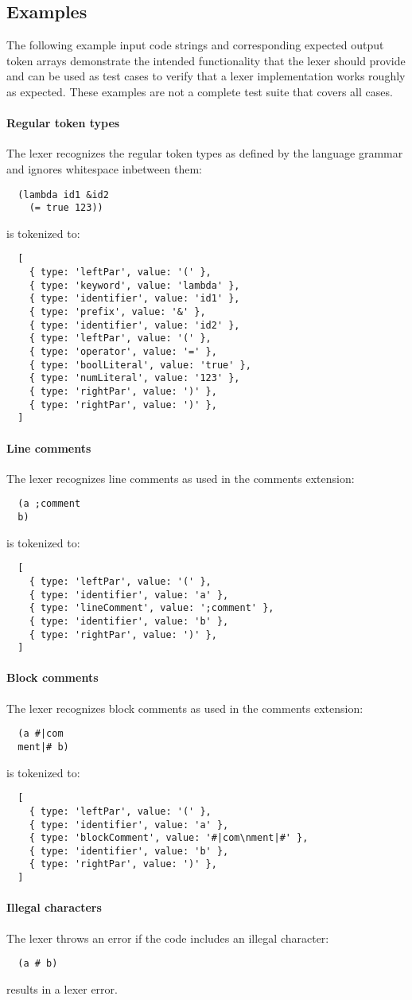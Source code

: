 \subsection{Examples}
The following example input code strings and corresponding expected output token arrays
demonstrate the intended functionality that the lexer should provide
and can be used as test cases to verify that a lexer implementation works roughly as expected.
These examples are not a complete test suite that covers all cases.

\paragraph{Regular token types}
The lexer recognizes the regular token types
as defined by the language grammar
and ignores whitespace inbetween them:
\begin{verbatim}
  (lambda id1 &id2
    (= true 123))
\end{verbatim}
is tokenized to:
\begin{verbatim}
  [
    { type: 'leftPar', value: '(' },
    { type: 'keyword', value: 'lambda' },
    { type: 'identifier', value: 'id1' },
    { type: 'prefix', value: '&' },
    { type: 'identifier', value: 'id2' },
    { type: 'leftPar', value: '(' },
    { type: 'operator', value: '=' },
    { type: 'boolLiteral', value: 'true' },
    { type: 'numLiteral', value: '123' },
    { type: 'rightPar', value: ')' },
    { type: 'rightPar', value: ')' },
  ]
\end{verbatim}

\paragraph{Line comments}
The lexer recognizes line comments
as used in the comments extension:
\begin{verbatim}
  (a ;comment
  b)
\end{verbatim}
is tokenized to:
\begin{verbatim}
  [
    { type: 'leftPar', value: '(' },
    { type: 'identifier', value: 'a' },
    { type: 'lineComment', value: ';comment' },
    { type: 'identifier', value: 'b' },
    { type: 'rightPar', value: ')' },
  ]
\end{verbatim}

\paragraph{Block comments}
The lexer recognizes block comments
as used in the comments extension:
\begin{verbatim}
  (a #|com
  ment|# b)
\end{verbatim}
is tokenized to:
\begin{verbatim}
  [
    { type: 'leftPar', value: '(' },
    { type: 'identifier', value: 'a' },
    { type: 'blockComment', value: '#|com\nment|#' },
    { type: 'identifier', value: 'b' },
    { type: 'rightPar', value: ')' },
  ]
\end{verbatim}

\paragraph{Illegal characters}
The lexer throws an error
if the code includes an illegal character:
\begin{verbatim}
  (a # b)
\end{verbatim}
results in a lexer error.
